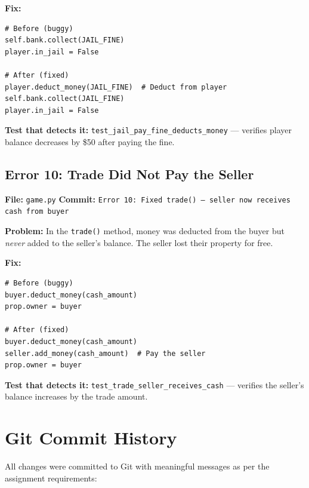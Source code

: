 \documentclass[12pt,a4paper]{article}
\begin{document}
\textbf{Fix:}
\begin{lstlisting}
# Before (buggy)
self.bank.collect(JAIL_FINE)
player.in_jail = False

# After (fixed)
player.deduct_money(JAIL_FINE)  # Deduct from player
self.bank.collect(JAIL_FINE)
player.in_jail = False
\end{lstlisting}

\textbf{Test that detects it:} \texttt{test\_jail\_pay\_fine\_deducts\_money} --- verifies player balance decreases by \$50 after paying the fine.


\subsection{Error 10: Trade Did Not Pay the Seller}
\textbf{File:} \texttt{game.py} \quad \textbf{Commit:} \texttt{Error 10: Fixed trade() --- seller now receives cash from buyer}

\textbf{Problem:} In the \texttt{trade()} method, money was deducted from the buyer but \textit{never} added to the seller's balance. The seller lost their property for free.

\textbf{Fix:}
\begin{lstlisting}
# Before (buggy)
buyer.deduct_money(cash_amount)
prop.owner = buyer

# After (fixed)
buyer.deduct_money(cash_amount)
seller.add_money(cash_amount)  # Pay the seller
prop.owner = buyer
\end{lstlisting}

\textbf{Test that detects it:} \texttt{test\_trade\_seller\_receives\_cash} --- verifies the seller's balance increases by the trade amount.

\newpage
\section{Git Commit History}

All changes were committed to Git with meaningful messages as per the assignment requirements:
\end{document}
